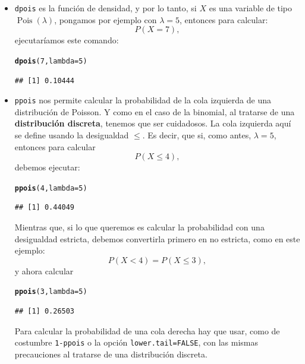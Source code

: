 \documentclass[10pt,a4paper]{article}\usepackage[]{graphicx}\usepackage[]{color}
\makeatletter
\newcommand{\hlnum}[1]{\textcolor[rgb]{0.686,0.059,0.569}{#1}}%
\newcommand{\hlstd}[1]{\textcolor[rgb]{0.345,0.345,0.345}{#1}}%
\newcommand{\hlkwc}[1]{\textcolor[rgb]{0.333,0.667,0.333}{#1}}%
\newcommand{\hlkwd}[1]{\textcolor[rgb]{0.737,0.353,0.396}{\textbf{#1}}}%
\newenvironment{kframe}{%
 \def\at@end@of@kframe{}%
 \ifinner\ifhmode%
  \def\at@end@of@kframe{\end{minipage}}%
  \begin{minipage}{\columnwidth}%
 \fi\fi%
 \def\FrameCommand##1{\hskip\@totalleftmargin \hskip-\fboxsep
 \colorbox{shadecolor}{##1}\hskip-\fboxsep
     \hskip-\linewidth \hskip-\@totalleftmargin \hskip\columnwidth}%
 \MakeFramed {\advance\hsize-\width
   \@totalleftmargin\z@ \linewidth\hsize
   \@setminipage}}%
 {\par\unskip\endMakeFramed%
 \at@end@of@kframe}
\newenvironment{knitrout}{}{} %
\makeatother
\begin{document}
\begin{itemize}

  \item {\tt dpois} es la función de densidad, y por lo tanto, si $X$ es una variable de tipo
      $\operatorname{Pois}(\lambda)$, pongamos por ejemplo con $\lambda=5$, entonces para
      calcular:
      \[P(X=7),\]
      ejecutaríamos este comando:
\begin{knitrout}
\color{fgcolor}\begin{kframe}
\begin{alltt}
\hlkwd{dpois}\hlstd{(}\hlnum{7}\hlstd{,} \hlkwc{lambda}\hlstd{=}\hlnum{5}\hlstd{)}
\end{alltt}
\begin{verbatim}
## [1] 0.10444
\end{verbatim}
\end{kframe}
\end{knitrout}

  \item {\tt ppois} nos permite calcular la probabilidad de la cola izquierda de una distribución de Poisson. Y como en el caso de la binomial, al tratarse de una {\bf distribución discreta}, tenemos que ser cuidadosos. La cola izquierda aquí se define usando la desigualdad $\leq$. Es decir, que si, como antes, $\lambda=5$, entonces para calcular
      \[P(X\leq 4),\]
      debemos ejecutar:
\begin{knitrout}
\color{fgcolor}\begin{kframe}
\begin{alltt}
\hlkwd{ppois}\hlstd{(}\hlnum{4}\hlstd{,} \hlkwc{lambda}\hlstd{=}\hlnum{5}\hlstd{)}
\end{alltt}
\begin{verbatim}
## [1] 0.44049
\end{verbatim}
\end{kframe}
\end{knitrout}
      Mientras que, si lo que queremos es calcular la probabilidad con una desigualdad estricta,
      debemos convertirla primero en no estricta, como en este ejemplo:
      \[P(X<4) = P(X\leq 3),\]
      y ahora calcular
\begin{knitrout}
\color{fgcolor}\begin{kframe}
\begin{alltt}
\hlkwd{ppois}\hlstd{(}\hlnum{3}\hlstd{,} \hlkwc{lambda}\hlstd{=}\hlnum{5}\hlstd{)}
\end{alltt}
\begin{verbatim}
## [1] 0.26503
\end{verbatim}
\end{kframe}
\end{knitrout}
      Para calcular la probabilidad de una cola derecha
      hay que usar, como de costumbre {\tt 1-ppois} o la opción {\tt lower.tail=FALSE}, con las mismas precauciones al tratarse de
      una distribución discreta.


\end{itemize}
\end{document}
